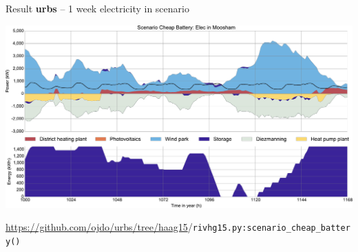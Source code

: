 \begin{frame}{Result \textbf{urbs} -- 1 week electricity in scenario }
    \begin{center}
        \includegraphics[width=.95\textwidth]{img/haag/scenario_cheap_battery-Elec-Moosham-spr_edit}
    \end{center}
    \vspace{-1em}
    {\tiny \url{https://github.com/ojdo/urbs/tree/haag15}/\texttt{rivhg15.py:scenario\_cheap\_battery()}}
\end{frame}
